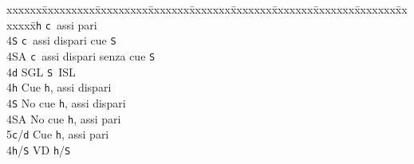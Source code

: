 \documentclass[a4paper,italian]{article}
\newcommand{\BS}{\small{\texttt{S}}}
\newcommand{\BC}{\small{\texttt{c}}}
\newcommand{\BD}{\small{\texttt{d}}}
\newcommand{\BH}{\small{\texttt{h}}}
\newenvironment{bidtable}
{\begin{tabbing}

    xxxxxx\=xxxxxxxxx\=xxxxxxxxx\=xxxxxxx\=xxxxxxx\=xxxxxxx\=xxxxxxx\=xxxxxxx\=xxxxxxx\=xxxxxxx\=\kill}
{\end{tabbing} }%
\begin{document}
\begin{multicols}{2}
\begin{bidtable}
        4\BH \> \BC\ assi pari\\
        4\BS \> \BC\ assi dispari cue \BS \\
        4\small{SA} \> \BC\ assi dispari senza cue \BS \-\\
        4\BD \> SGL \BS\ ISL\+\\
        4\BH \> Cue \BH, assi dispari\\
        4\BS \> No cue \BH, assi dispari\\
        4\small{SA} \> No cue \BH, assi pari\\
        5\BC/\BD \> Cue \BH, assi pari\-\\
        4\BH/\BS \> VD \BH /\BS
    \end{bidtable}
\end{multicols}

\newpage
\end{document}
